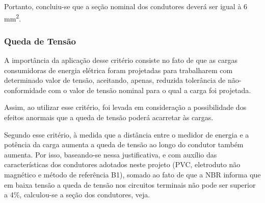 Portanto, concluiu-se que a seção nominal dos condutores deverá ser igual à 6 mm\textsuperscript{2}.

\subsubsection{Queda de Tensão }

A importância da aplicação desse critério consiste no fato de que as cargas consumidoras de energia elétrica foram projetadas para trabalharem com determinado valor de tensão, aceitando, apenas, reduzida tolerância de não-conformidade com o valor de tensão nominal para o qual a carga foi projetada.

Assim, ao utilizar esse critério, foi levada em consideração a possibilidade dos efeitos anormais que a queda de tensão poderá acarretar às cargas.

 	Segundo esse critério, à medida que a distância entre o medidor de energia e a potência da carga aumenta a queda de tensão ao longo do condutor também aumenta. Por isso, baseando-se nessa justificativa, e com auxílio das características dos condutores adotados neste projeto (PVC, eletroduto não magnético e método de referência B1), somado ao fato de que a NBR informa que em baixa tensão a queda de tensão nos circuitos terminais não pode ser superior a 4\%, calculou-se a seção dos condutores, veja.
 	
